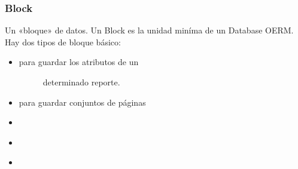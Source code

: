 \documentclass[a4paper,12pt,spanish]{sphinxmanual}
\begin{document}
\subsubsection{Block}
\label{\detokenize{openerm.Block:id1}}\label{\detokenize{openerm.Block::doc}}
Un «bloque» de datos. Un Block es la unidad miníma de un Database OERM. Hay dos
tipos de bloque básico:
\begin{itemize}
\item {} \begin{description}
\item[{{\hyperref[\detokenize{openerm.MetadataContainer:module-openerm.MetadataContainer}]{}} para guardar los atributos de un}] \leavevmode
determinado reporte.

\end{description}

\item {} 
{\hyperref[\detokenize{openerm.PageContainer:module-openerm.PageContainer}]{}} para guardar conjuntos de páginas

\end{itemize}



\begin{itemize}
\item {} 
{\hyperref[\detokenize{openerm.Database:module-openerm.Database}]{}}

\item {} 
{\hyperref[\detokenize{openerm.Compressor:module-openerm.Compressor}]{}}

\item {} 
{\hyperref[\detokenize{openerm.Cipher:module-openerm.Cipher}]{}}

\end{itemize}


\end{document}
